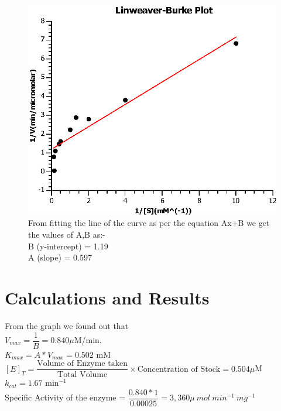 \documentclass[12pt]{article}
\theoremstyle{definition}
\theoremstyle{definition}
\theoremstyle{remark}
\begin{document}
\begin{figure}[H]
\includegraphics[width=16cm]{Graph23.eps}
\centering
From fitting the line of the curve as per the equation Ax+B we get the values of A,B as:-\\[2ex]
B (y-intercept) = 1.19\\
A (slope) = 0.597
\end{figure}
\section{Calculations and Results}

From the graph we found out that \\

$V_{max}=\dfrac{1}{B}=0.840 \mu $M/min. \\

$K_{max}=A*V_{max}=0.502$ mM\\


$[E]_{T}= \dfrac{\text{Volume of Enzyme taken}}{\text{Total Volume}} \times \text{Concentration of Stock} = 0.504  \mu$M \\

$k_{cat}=1.67 $  min$^{-1}$\\

Specific Activity of the enzyme = $\dfrac{0.840*1}{0.00025} = 3,360
  \mu ~mol~ min^{-1}~mg^{-1}$


\newpage
\end{document}
